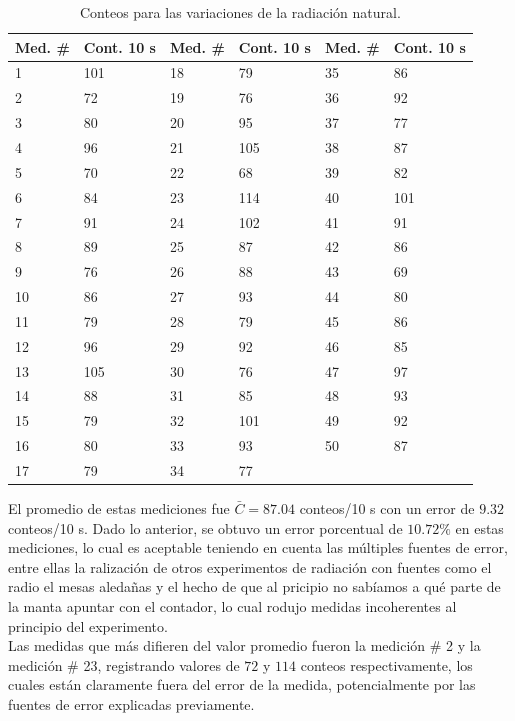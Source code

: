 \documentclass[prb,aps,twocolumn,preprintnumbers,amsmath,amssymb]{revtex4}
\begin{document}
\begin{table}[h!]
	\caption{\label{tabla2}Conteos para las variaciones de la radiación natural.}
	\begin{ruledtabular}
		\begin{tabular}{|M{1.cm}|M{1.cm}|M{1.cm}|M{1.cm}|M{1.cm}|M{1.cm}|}
			Med. \# & Cont.  10 s & Med. \# & Cont.  10 s & Med. \# & Cont.  10 s\\
			 & 101 & 18 & 79 & 35 & 86\\
			2 & 72 & 19 & 76 & 36 & 92\\
			3 & 80 & 20 & 95 & 37 & 77\\
			4 & 96 & 21 & 105 & 38 & 87\\
			5 & 70 & 22 & 68 & 39 & 82\\
			6 & 84 & 23 & 114 & 40 & 101\\
			7 & 91 & 24 & 102 & 41 & 91\\
			8 & 89 & 25 & 87 & 42 & 86\\
			9 & 76 & 26 & 88 & 43 & 69\\
			10 & 86 & 27 & 93 & 44 & 80\\
			11 & 79 & 28 & 79 & 45 & 86\\
			12 & 96 & 29 & 92 & 46 & 85\\
			13 & 105 & 30 & 76 & 47 & 97\\
			14 & 88 & 31 & 85 & 48 & 93\\
			15 & 79 & 32 & 101 & 49 & 92\\
			16 & 80 & 33 & 93 & 50 & 87\\
			17 & 79 & 34 & 77 &  & \\
		\end{tabular}
	\end{ruledtabular}
\end{table}

El promedio de estas mediciones fue $\bar{C} = 87.04$ conteos/10 s con un error de $9.32$ conteos/10 s. Dado lo anterior, se obtuvo un error porcentual de $10.72 \%$ en estas mediciones, lo cual es aceptable teniendo en cuenta las múltiples fuentes de error, entre ellas la ralización de otros experimentos de radiación con fuentes como el radio el mesas aledañas y el hecho de que al pricipio no sabíamos a qué parte de la manta apuntar con el contador, lo cual rodujo medidas incoherentes al principio del experimento.\\

Las medidas que más difieren del valor promedio fueron la medición \# 2 y la medición \# 23, registrando valores de $72$ y $114$ conteos respectivamente, los cuales están claramente fuera del error de la medida, potencialmente por las fuentes de error explicadas previamente.\\
\end{document}
